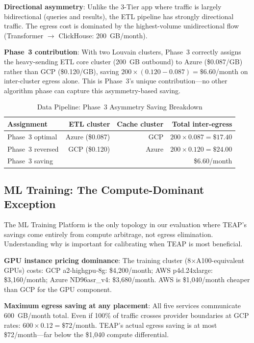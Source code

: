 \documentclass[10pt,journal]{IEEEtran}
\begin{document}
\textbf{Directional asymmetry}: Unlike the 3-Tier app where traffic is largely
bidirectional (queries and results), the ETL pipeline has strongly directional
traffic.
The egress cost is dominated by the highest-volume unidirectional flow
(Transformer $\to$ ClickHouse: 200~GB/month).

\textbf{Phase~3 contribution}: With two Louvain clusters, Phase~3 correctly assigns
the heavy-sending ETL core cluster (200~GB outbound) to Azure (\$0.087/GB) rather
than GCP (\$0.120/GB), saving $200 \times (0.120 - 0.087) = \$6.60$/month on
inter-cluster egress alone.
This is Phase~3's unique contribution---no other algorithm phase can capture
this asymmetry-based saving.

\begin{table}[ht]
\centering
\caption{Data Pipeline: Phase~3 Asymmetry Saving Breakdown}
\label{tab:pipeline_p3}
\setlength{\tabcolsep}{4pt}
\begin{tabular}{lrrr}
\toprule
Assignment & ETL cluster & Cache cluster & Total inter-egress\\
\midrule
Phase~3 optimal  & Azure (\$0.087) & GCP & $200\times0.087 = \$17.40$\\
Phase~3 reversed & GCP (\$0.120)   & Azure & $200\times0.120 = \$24.00$\\
\midrule
Phase~3 saving   & & & \$6.60/month\\
\bottomrule
\end{tabular}
\end{table}

\subsection{ML Training: The Compute-Dominant Exception}

The ML Training Platform is the only topology in our evaluation where TEAP's
savings come entirely from compute arbitrage, not egress elimination.
Understanding why is important for calibrating when TEAP is most beneficial.

\textbf{GPU instance pricing dominance}:
The training cluster (8$\times$A100-equivalent GPUs) costs:
GCP a2-highgpu-8g: \$4,200/month;
AWS p4d.24xlarge: \$3,160/month;
Azure ND96asr\_v4: \$3,680/month.
AWS is \$1,040/month cheaper than GCP for the GPU component.

\textbf{Maximum egress saving at any placement}: All five services communicate
600~GB/month total. Even if 100\% of traffic crosses provider boundaries at
GCP rates: $600 \times 0.12 = \$72$/month.
TEAP's actual egress saving is at most \$72/month---far below the \$1,040
compute differential.
\end{document}
